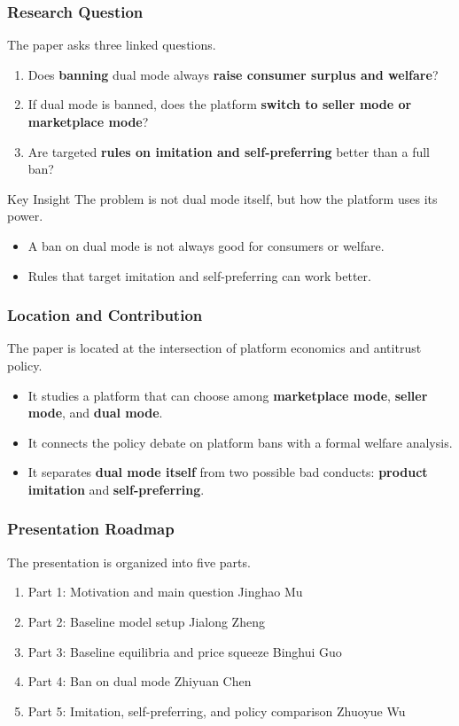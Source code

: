 \begin{frame}
  \frametitle{Research Question}
  The paper asks three linked questions.

  \begin{enumerate}
    \item Does \textbf{banning} dual mode always \textbf{raise consumer surplus and welfare}?
    \item If dual mode is banned, does the platform \textbf{switch to seller mode or marketplace mode}?
    \item Are targeted \textbf{rules on imitation and self-preferring} better than a full ban?
  \end{enumerate}

  \begin{block}{Key Insight}
    The problem is not dual mode itself, but how the platform uses its power.
    \begin{itemize}
        \item A ban on dual mode is not always good for consumers or welfare.
        \item Rules that target imitation and self-preferring can work better.
    \end{itemize}
    
  \end{block}

\end{frame}

\begin{frame}
  \frametitle{Location and Contribution}
  The paper is located at the intersection of platform economics and antitrust policy.

  \begin{itemize}
    \item It studies a platform that can choose among \textbf{marketplace mode}, \textbf{seller mode}, and \textbf{dual mode}.
    \item It connects the policy debate on platform bans with a formal welfare analysis.
    \item It separates \textbf{dual mode itself} from two possible bad conducts: \textbf{product imitation} and \textbf{self-preferring}.
  \end{itemize}
\end{frame}

\begin{frame}
  \frametitle{Presentation Roadmap}
   The presentation is organized into five parts.
  \begin{enumerate}
    \item Part 1: Motivation and main question \hfill Jinghao Mu
    \item Part 2: Baseline model setup \hfill Jialong Zheng
    \item Part 3: Baseline equilibria and price squeeze \hfill Binghui Guo
    \item Part 4: Ban on dual mode \hfill Zhiyuan Chen
    \item Part 5: Imitation, self-preferring, and policy comparison \hfill Zhuoyue Wu
  \end{enumerate}
\end{frame}
